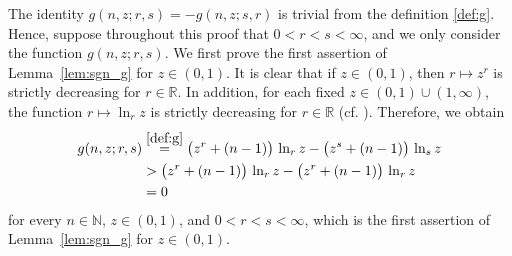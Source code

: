 \documentclass[conference, draftcls, onecolumn]{IEEEtran}
\theoremstyle{plain}
\newcommand{\lemref}[1]{Lemma~\ref{#1}}
\begin{document}
\begin{IEEEproof}[Proof of \lemref{lem:sgn_g}]
The identity $g(n, z; r, s) = - g(n, z; s, r)$ is trivial from the definition \eqref{def:g}.
Hence, suppose throughout this proof that $0 < r < s < \infty$, and we only consider the function $g(n, z; r, s)$.
We first prove the first assertion of \lemref{lem:sgn_g} for $z \in (0, 1)$.
It is clear that if $z \in (0, 1)$, then $r \mapsto z^{r}$ is strictly decreasing for $r \in \mathbb{R}$.
In addition, for each fixed $z \in (0, 1) \cup (1, \infty)$, the function $r \mapsto \ln_{r} z$ is strictly decreasing for $r \in \mathbb{R}$ (cf. \cite[Lemma~1]{part2}).
Therefore, we obtain
\begin{align}
g(n, z; r, s)
& \overset{\eqref{def:g}}{=}
\big( z^{r} + (n-1) \big) \, \ln_{r} z - \big( z^{s} + (n-1) \big) \, \ln_{s} z
\\
& >
\big( z^{r} + (n-1) \big) \, \ln_{r} z - \big( z^{r} + (n-1) \big) \, \ln_{r} z
\\
& =
0
\end{align}
for every $n \in \mathbb{N}$, $z \in (0, 1)$, and $0 < r < s < \infty$, which is the first assertion of \lemref{lem:sgn_g} for $z \in (0, 1)$.






\end{IEEEproof}
\end{document}
